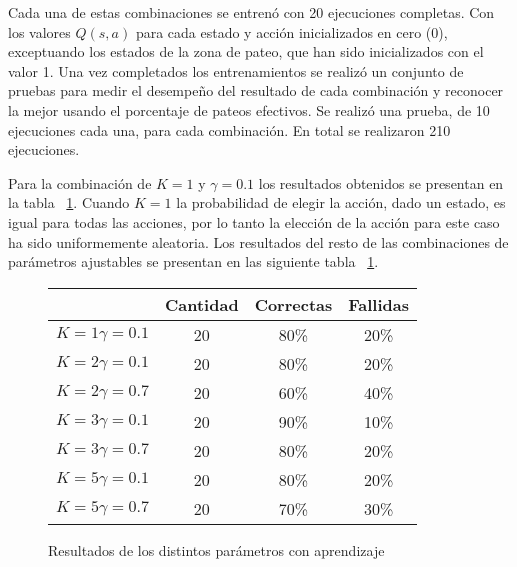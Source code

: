 Cada una de estas combinaciones se entrenó con 20 ejecuciones completas. Con los valores $Q(s,a)$ para cada estado y acción inicializados en cero (0), exceptuando los estados de la zona de pateo, que han sido inicializados con el valor 1. Una vez completados los entrenamientos se realizó un conjunto de pruebas para medir el desempeño del resultado de cada combinación y reconocer la mejor usando el porcentaje de pateos efectivos. Se realizó una prueba, de 10 ejecuciones cada una, para cada combinación. En total se realizaron 210 ejecuciones. 

Para la combinaci\'on de $K = 1$ y $ \gamma = 0.1 $ los resultados obtenidos se presentan en la tabla ~\ref{tabla:entramientos}. Cuando $K = 1$ la probabilidad de elegir la acci\'on, dado un estado, es igual para todas las acciones, por lo tanto la elección de la acción para este caso ha sido uniformemente aleatoria. Los resultados del resto de las combinaciones de par\'ametros ajustables se presentan en las siguiente tabla ~\ref{tabla:entramientos}.
\begin{figure}
\centering
\begin{tabular}{|c|c|c|c|}
\hline 
& Cantidad & Correctas & Fallidas \\ 
\hline 
$K = 1  \gamma = 0.1$ & 20 & 80\% & 20\% \\ 
\hline 
$K = 2  \gamma = 0.1$ & 20 & 80\% & 20\% \\ 
\hline 
$K = 2  \gamma = 0.7$ & 20 & 60\% & 40\% \\ 
\hline 
$K = 3  \gamma = 0.1$ & 20 & 90\% & 10\% \\ 
\hline 
$K = 3  \gamma = 0.7$ & 20 & 80\% & 20\% \\ 
\hline 
$K = 5  \gamma = 0.1$ & 20 & 80\% & 20\% \\ 
\hline  
$K = 5  \gamma = 0.7$ & 20 & 70\% & 30\% \\ 
\hline 

\end{tabular} 

\caption{Resultados de los distintos par\'ametros con aprendizaje}
\label{tabla:entramientos}


\end{figure}
%
